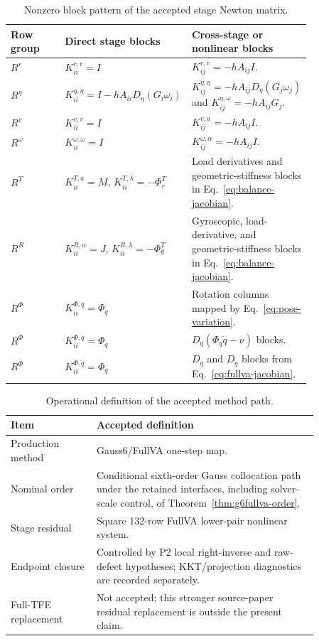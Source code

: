 \documentclass[preprint,12pt]{elsarticle}
\newcommand{\method}{Gauss6\slash FullVA}
\newcommand{\tfe}{TFE}
\begin{document}
\begin{table}[htbp]
\centering
\scriptsize
\setlength{\tabcolsep}{3pt}
\caption{Nonzero block pattern of the accepted stage Newton matrix.}
\label{tab:stage-jacobian-block}
\begin{tabular}{P{0.18\linewidth}P{0.27\linewidth}P{0.39\linewidth}}
\toprule
Row group & Direct stage blocks & Cross-stage or nonlinear blocks \\
\midrule
$R^r$ &
$K^{r,r}_{ii}=I$ &
$K^{r,v}_{ij}=-hA_{ij}I$. \\
$R^\eta$ &
$K^{\eta,\eta}_{ii}=I-hA_{ii}D_\eta(G_i\omega_i)$ &
$K^{\eta,\eta}_{ij}=-hA_{ij}D_\eta(G_j\omega_j)$ and
$K^{\eta,\omega}_{ij}=-hA_{ij}G_j$. \\
$R^v$ &
$K^{v,v}_{ii}=I$ &
$K^{v,a}_{ij}=-hA_{ij}I$. \\
$R^\omega$ &
$K^{\omega,\omega}_{ii}=I$ &
$K^{\omega,\alpha}_{ij}=-hA_{ij}I$. \\
$R^T$ &
$K^{T,a}_{ii}=M$, $K^{T,\lambda}_{ii}=-\Phi_r^T$ &
Load derivatives and geometric-stiffness blocks in
Eq.~\eqref{eq:balance-jacobian}. \\
$R^R$ &
$K^{R,\alpha}_{ii}=J$, $K^{R,\lambda}_{ii}=-\Phi_\theta^T$ &
Gyroscopic, load-derivative, and geometric-stiffness blocks in
Eq.~\eqref{eq:balance-jacobian}. \\
$R^\Phi$ &
$K^{\Phi,q}_{ii}=\Phi_q$ &
Rotation columns mapped by Eq.~\eqref{eq:pose-variation}. \\
$R^{\dot\Phi}$ &
$K^{\dot\Phi,\dot q}_{ii}=\Phi_q$ &
$D_q(\Phi_q\dot q-\nu)$ blocks. \\
$R^{\ddot\Phi}$ &
$K^{\ddot\Phi,\ddot q}_{ii}=\Phi_q$ &
$D_q$ and $D_{\dot q}$ blocks from Eq.~\eqref{eq:fullva-jacobian}. \\
\bottomrule
\end{tabular}
\end{table}

\begin{table}[htbp]
\centering
\caption{Operational definition of the accepted method path.}
\label{tab:method-path}
\begin{tabular}{P{0.24\linewidth}P{0.62\linewidth}}
\toprule
Item & Accepted definition \\
\midrule
Production method & \method{} one-step map. \\
Nominal order & Conditional sixth-order Gauss collocation path under the
retained interfaces, including solver-scale control, of
Theorem~\ref{thm:g6fullva-order}. \\
Stage residual & Square 132-row FullVA lower-pair nonlinear system. \\
Endpoint closure & Controlled by P2 local right-inverse and raw-defect
hypotheses; KKT/projection diagnostics are recorded separately. \\
Full-\tfe{} replacement & Not accepted; this stronger source-paper residual
replacement is outside the present claim. \\
\bottomrule
\end{tabular}
\end{table}
\end{document}
